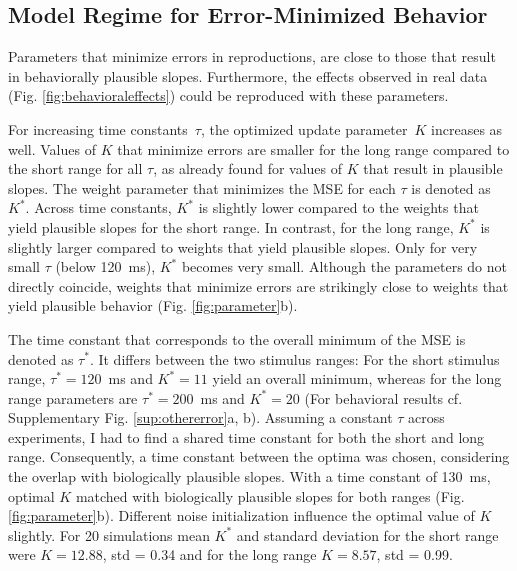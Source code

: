 \documentclass[10pt]{article}
\begin{document}
\subsection{Model Regime for Error-Minimized Behavior}
Parameters that minimize errors in reproductions, are close to those that result in behaviorally plausible slopes. Furthermore, the effects observed in real data (Fig. \ref{fig:behavioraleffects}) could be reproduced with these parameters.

For increasing time constants~$\tau$, the optimized update parameter~$K$ increases as well. Values of $K$ that minimize errors are smaller for the long range compared to the short range for all $\tau$, as already found for values of $K$ that result in plausible slopes.
The weight parameter that minimizes the MSE for each $\tau$ is denoted as $K^*$. Across time constants,  $K^*$ is slightly lower compared to the weights that yield plausible slopes for the short range. In contrast, for the long range, $K^*$ is slightly larger compared to  weights that yield plausible slopes. Only for very small $\tau$ (below 120~ms), $K^*$ becomes very small.
Although the parameters do not directly coincide, weights that minimize errors are strikingly close to weights that yield plausible behavior (Fig. \ref{fig:parameter}b). 

The time constant that corresponds to the overall minimum of the MSE is denoted as $\tau^*$. 
It differs between the two stimulus ranges:
For the short stimulus range, $\tau^* = 120$~ms and $K^* = 11$ yield an overall minimum, whereas for the long range parameters are $\tau^* = 200$~ms and $K^* = 20$ (For behavioral results cf. Supplementary Fig. \ref{sup:othererror}a, b).
Assuming a constant $\tau$ across experiments, I had to find a shared time constant for both the short and long range. 
Consequently, a time constant between the optima was chosen, considering the overlap with biologically plausible slopes.
With a time constant of 130~ms, optimal $K$ matched with biologically plausible slopes for both ranges (Fig. \ref{fig:parameter}b).
Different noise initialization influence the optimal value of $K$ slightly. For 20 simulations mean $K^*$ and standard deviation for the short range were $K = 12.88$, std = 0.34 and for the long range $K = 8.57$, std = 0.99. 
\end{document}
